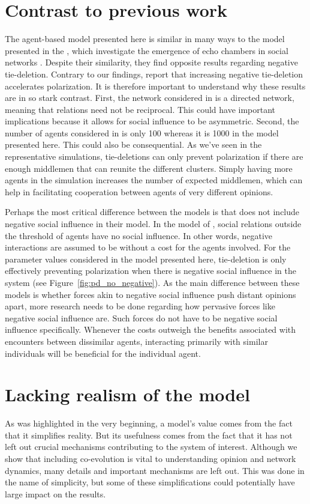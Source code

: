 \documentclass[11pt]{article}
\begin{document}
\section{Contrast to previous work}
The agent-based model presented here is similar in many ways to the model presented in the \textit{}, which investigate the emergence of echo chambers in social networks \cite{sasahara_social_2021}. Despite their similarity, they find opposite results regarding negative tie-deletion. Contrary to our findings,  report that increasing negative tie-deletion accelerates polarization. It is therefore important to understand why these results are in so stark contrast. First, the network considered in  is a directed network, meaning that relations need not be reciprocal. This could have important implications because it allows for social influence to be asymmetric. Second, the number of agents considered in  is only 100 whereas it is 1000 in the model presented here. This could also be consequential. As we've seen in the representative simulations, tie-deletions can only prevent polarization if there are enough middlemen that can reunite the different clusters. Simply having more agents in the simulation increases the number of expected middlemen, which can help in facilitating cooperation between agents of very different opinions. 

Perhaps the most critical difference between the models is that  does not include negative social influence in their model. In the model of , social relations outside the threshold of agents have no social influence. In other words, negative interactions are assumed to be without a cost for the agents involved. For the parameter values considered in the model presented here, tie-deletion is only effectively preventing polarization when there is negative social influence in the system (see Figure~\ref{fig:pd_no_negative}). 
As the main difference between these models is whether forces akin to negative social influence push distant opinions apart, more research needs to be done regarding how pervasive forces like negative social influence are. Such forces do not have to be negative social influence specifically. Whenever the costs outweigh the benefits associated with encounters between dissimilar agents, interacting primarily with similar individuals will be beneficial for the individual agent.

\section{Lacking realism of the model}
As was highlighted in the very beginning, a model's value comes from the fact that it simplifies reality. But its usefulness comes from the fact that it has not left out crucial mechanisms contributing to the system of interest. Although we show that including co-evolution is vital to understanding opinion and network dynamics, many details and important mechanisms are left out. This was done in the name of simplicity, but some of these simplifications could potentially have large impact on the results. 
\end{document}
